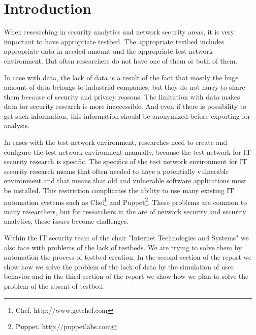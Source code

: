 \section{Introduction}


When researching in security analytics and network security areas, it is very important to have appropriate testbed. The appropriate testbed includes appropriate data in needed amount and the appropriate test network environment. But often researchers do not have one of them or both of them.  

In case with data, the lack of data is a result of the fact that mostly the huge amount of data belongs to industrial companies, but they do not hurry to share them because of security and privacy reasons. The limitation with data makes data for security research is more inaccessible. And even if there is possibility to get such information, this information should be anonymized before exporting for analysis.

In cases with the test network environment, researches need to create and configure the test network environment manually, because the test network for IT security research is specific. The specifics of the test network environment for IT security research means that often needed to have a potentially vulnerable environment and that means that old and vulnerable software applications must be installed. This restriction complicates the ability to use many existing IT automation systems such as Chef\footnote{Chef. http://www.getchef.com} and Puppet\footnote{Puppet. http://puppetlabs.com}. These problems are common to many researchers, but for researchers in the are of network security and security analytics, these issues become challenges. 

Within the IT security team of the chair "Internet Technologies and Systems" we also face with problems of the lack of testbeds. We are trying to solve them by automation the process of testbed creation. In the second section of the report we show how we solve the problem of the lack of data by the simulation of user behavior and in the third section of the report we show how we plan to solve the problem of the absent of testbed.



